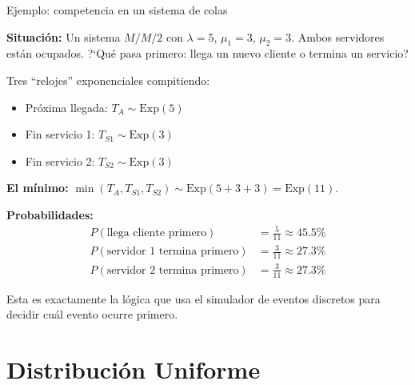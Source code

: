 \documentclass[aspectratio=1610, 9pt]{beamer}
\begin{document}
\begin{frame}{Ejemplo: competencia en un sistema de colas}

\textbf{Situaci\'{o}n:} Un sistema $M/M/2$ con $\lambda = 5$, $\mu_1 = 3$, $\mu_2 = 3$. Ambos servidores est\'{a}n ocupados. ?`Qu\'{e} pasa primero: llega un nuevo cliente o termina un servicio?

\vspace{0.3cm}
Tres ``relojes'' exponenciales compitiendo:
\begin{itemize}
    \item Pr\'{o}xima llegada: $T_A \sim \text{Exp}(5)$
    \item Fin servicio 1: $T_{S1} \sim \text{Exp}(3)$
    \item Fin servicio 2: $T_{S2} \sim \text{Exp}(3)$
\end{itemize}

\vspace{0.2cm}
\textbf{El m\'{i}nimo:} $\min(T_A, T_{S1}, T_{S2}) \sim \text{Exp}(5+3+3) = \text{Exp}(11)$.

\vspace{0.2cm}
\textbf{Probabilidades:}
\begin{align}
P(\text{llega cliente primero}) &= \frac{5}{11} \approx 45.5\% \\
P(\text{servidor 1 termina primero}) &= \frac{3}{11} \approx 27.3\% \\
P(\text{servidor 2 termina primero}) &= \frac{3}{11} \approx 27.3\%
\end{align}

Esta es exactamente la l\'{o}gica que usa el simulador de eventos discretos para decidir cu\'{a}l evento ocurre primero.
\end{frame}

\section{Distribuci\'{o}n Uniforme}
\end{document}
